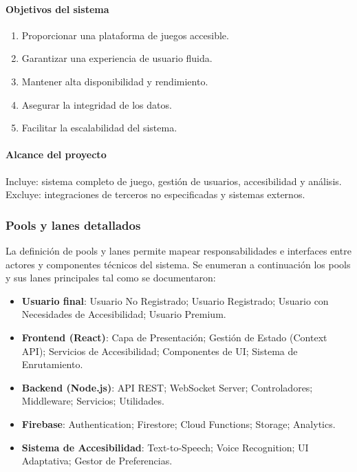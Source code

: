 \documentclass[12pt]{article}
\begin{document}
\paragraph{Objetivos del sistema}
\begin{enumerate}
  \item Proporcionar una plataforma de juegos accesible.
  \item Garantizar una experiencia de usuario fluida.
  \item Mantener alta disponibilidad y rendimiento.
  \item Asegurar la integridad de los datos.
  \item Facilitar la escalabilidad del sistema.
\end{enumerate}

\paragraph{Alcance del proyecto}
Incluye: sistema completo de juego, gestión de usuarios, accesibilidad y análisis.\\
Excluye: integraciones de terceros no especificadas y sistemas externos.

\subsubsection*{Pools y lanes detallados}
La definición de pools y lanes permite mapear responsabilidades e interfaces entre actores y componentes técnicos del sistema. Se enumeran a continuación los pools y sus lanes principales tal como se documentaron:
\begin{itemize}
  \item \textbf{Usuario final}: Usuario No Registrado; Usuario Registrado; Usuario con Necesidades de Accesibilidad; Usuario Premium.
  \item \textbf{Frontend (React)}: Capa de Presentación; Gestión de Estado (Context API); Servicios de Accesibilidad; Componentes de UI; Sistema de Enrutamiento.
  \item \textbf{Backend (Node.js)}: API REST; WebSocket Server; Controladores; Middleware; Servicios; Utilidades.
  \item \textbf{Firebase}: Authentication; Firestore; Cloud Functions; Storage; Analytics.
  \item \textbf{Sistema de Accesibilidad}: Text-to-Speech; Voice Recognition; UI Adaptativa; Gestor de Preferencias.
\end{itemize}
\end{document}
